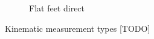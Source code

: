 \begin{figure}
\begin{subfigure}{.33\linewidth}
        \caption{Flat feet direct}
    \end{subfigure}%
    \caption{Kinematic measurement types [TODO]
        }
\end{figure}
